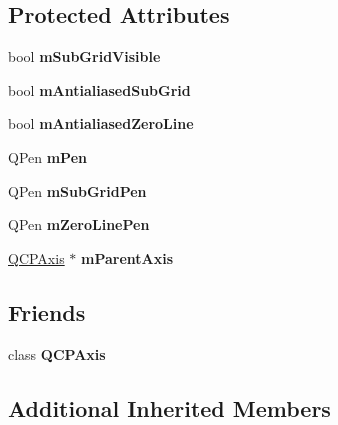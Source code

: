 \subsection*{Protected Attributes}
\begin{DoxyCompactItemize}
\item 
\mbox{\label{class_q_c_p_grid_a4e4a0400d6319bb44c06341f6298c87b}} 
bool {\bfseries m\+Sub\+Grid\+Visible}
\item 
\mbox{\label{class_q_c_p_grid_a71b7051f833f0c5de3094998d6afdd87}} 
bool {\bfseries m\+Antialiased\+Sub\+Grid}
\item 
\mbox{\label{class_q_c_p_grid_a8c0df56ae86440408c050895dcdb922b}} 
bool {\bfseries m\+Antialiased\+Zero\+Line}
\item 
\mbox{\label{class_q_c_p_grid_a1cdc4a3bccf6a40c2d4360def9fefa40}} 
Q\+Pen {\bfseries m\+Pen}
\item 
\mbox{\label{class_q_c_p_grid_aa9004bc139ad3ea92629f0aaae81d83f}} 
Q\+Pen {\bfseries m\+Sub\+Grid\+Pen}
\item 
\mbox{\label{class_q_c_p_grid_a379481871f17655c27eda30af233554f}} 
Q\+Pen {\bfseries m\+Zero\+Line\+Pen}
\item 
\mbox{\label{class_q_c_p_grid_a9a8a76731e6e737b65b929fd1995cc88}} 
\hyperlink{class_q_c_p_axis}{Q\+C\+P\+Axis} $\ast$ {\bfseries m\+Parent\+Axis}
\end{DoxyCompactItemize}
\subsection*{Friends}
\begin{DoxyCompactItemize}
\item 
\mbox{\label{class_q_c_p_grid_af123edeca169ec7a31958a1d714e1a8a}} 
class {\bfseries Q\+C\+P\+Axis}
\end{DoxyCompactItemize}
\subsection*{Additional Inherited Members}


